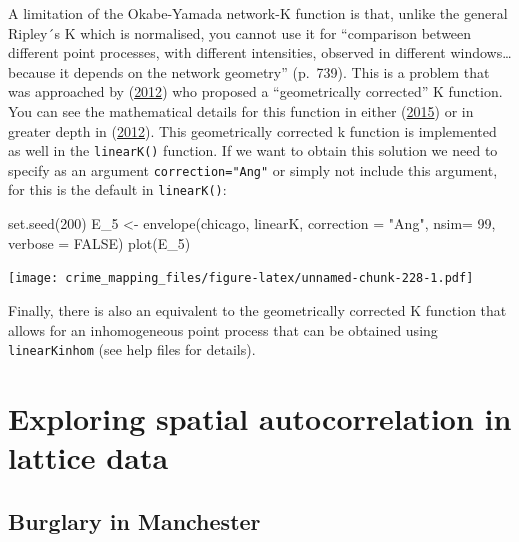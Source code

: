 \documentclass[
  krantz2]{krantz}
\makeatletter
\newenvironment{Shaded}{\begin{snugshade}}{\end{snugshade}}
\newcommand{\AttributeTok}[1]{\textcolor[rgb]{0.61,0.61,0.61}{#1}}
\newcommand{\ConstantTok}[1]{\textcolor[rgb]{0,0,0}{#1}}
\newcommand{\DecValTok}[1]{\textcolor[rgb]{0.06,0.06,0.06}{#1}}
\newcommand{\FunctionTok}[1]{\textcolor[rgb]{0,0,0}{#1}}
\newcommand{\NormalTok}[1]{#1}
\newcommand{\OtherTok}[1]{\textcolor[rgb]{0.37,0.37,0.37}{#1}}
\newcommand{\StringTok}[1]{\textcolor[rgb]{0.5,0.5,0.5}{#1}}
\newenvironment{kframe}{%
\medskip{}
\setlength{\fboxsep}{.8em}
 \def\at@end@of@kframe{}%
 \ifinner\ifhmode%
  \def\at@end@of@kframe{\end{minipage}}%
  \begin{minipage}{\columnwidth}%
 \fi\fi%
 \def\FrameCommand##1{\hskip\@totalleftmargin \hskip-\fboxsep
 \colorbox{shadecolor}{##1}\hskip-\fboxsep
     \hskip-\linewidth \hskip-\@totalleftmargin \hskip\columnwidth}%
 \MakeFramed {\advance\hsize-\width
   \@totalleftmargin\z@ \linewidth\hsize
   \@setminipage}}%
 {\par\unskip\endMakeFramed%
 \at@end@of@kframe}
\renewenvironment{Shaded}{\begin{kframe}}{\end{kframe}}
\makeatother
\begin{document}
A limitation of the Okabe-Yamada network-K function is that, unlike the general Ripley´s K which is normalised, you cannot use it for ``comparison between different point processes, with different intensities, observed in different windows\ldots{} because it depends on the network geometry'' (p.~739). This is a problem that was approached by (\protect\hyperlink{ref-Ang_2012}{2012}) who proposed a ``geometrically corrected'' K function. You can see the mathematical details for this function in either (\protect\hyperlink{ref-Baddeley_2016}{2015}) or in greater depth in (\protect\hyperlink{ref-Ang_2012}{2012}). This geometrically corrected k function is implemented as well in the \texttt{linearK()} function. If we want to obtain this solution we need to specify as an argument \texttt{correction="Ang"} or simply not include this argument, for this is the default in \texttt{linearK()}:

\begin{Shaded}
\begin{Highlighting}[]
\FunctionTok{set.seed}\NormalTok{(}\DecValTok{200}\NormalTok{)}
\NormalTok{E\_5 }\OtherTok{\textless{}{-}} \FunctionTok{envelope}\NormalTok{(chicago, linearK, }\AttributeTok{correction =} \StringTok{"Ang"}\NormalTok{, }\AttributeTok{nsim=} \DecValTok{99}\NormalTok{, }\AttributeTok{verbose =} \ConstantTok{FALSE}\NormalTok{)}
\FunctionTok{plot}\NormalTok{(E\_5)}
\end{Highlighting}
\end{Shaded}

\texttt{[image: crime\_mapping\_files/figure-latex/unnamed-chunk-228-1.pdf]}

Finally, there is also an equivalent to the geometrically corrected K function that allows for an inhomogeneous point process that can be obtained using \texttt{linearKinhom} (see help files for details).

\hypertarget{exploring-spatial-autocorrelation-in-lattice-data}{%
\section{Exploring spatial autocorrelation in lattice data}\label{exploring-spatial-autocorrelation-in-lattice-data}}

\hypertarget{burglary-in-manchester}{%
\subsection{Burglary in Manchester}\label{burglary-in-manchester}}
\end{document}
